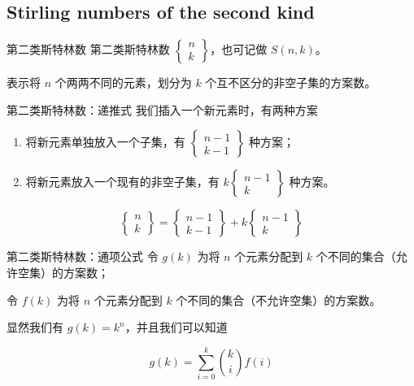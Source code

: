 \documentclass[12pt,aspectratio=169]{beamer}
\begin{document}
\subsection[第二类斯特林数]{Stirling numbers of the second kind}

\begin{frame}[fragile]{第二类斯特林数}
第二类斯特林数 $\begin{Bmatrix}n\\ k\end{Bmatrix}$，也可记做 $S(n, k)$。

表示将 $n$ 个两两不同的元素，划分为 $k$ 个互不区分的非空子集的方案数。
\end{frame}

\begin{frame}[fragile]{第二类斯特林数：递推式}
我们插入一个新元素时，有两种方案

\begin{enumerate}
  \item 将新元素单独放入一个子集，有 $\begin{Bmatrix}n-1\\ k-1\end{Bmatrix}$ 种方案；
  \item 将新元素放入一个现有的非空子集，有 $k\begin{Bmatrix}n-1\\ k\end{Bmatrix}$ 种方案。
\end{enumerate}

$$
\begin{Bmatrix}n\\ k\end{Bmatrix} = \begin{Bmatrix}n-1\\ k-1\end{Bmatrix} + k\begin{Bmatrix}n-1\\ k\end{Bmatrix}
$$
\end{frame}

\begin{frame}[fragile]{第二类斯特林数：通项公式}
令 $g(k)$ 为将 $n$ 个元素分配到 $k$ 个不同的集合（允许空集）的方案数；

令 $f(k)$ 为将 $n$ 个元素分配到 $k$ 个不同的集合（不允许空集）的方案数。

显然我们有 $g(k) = k^n$，并且我们可以知道

$$
g(k) = \sum_{i=0}^{k} {k \choose i} f(i)
$$
\end{frame}
\end{document}
